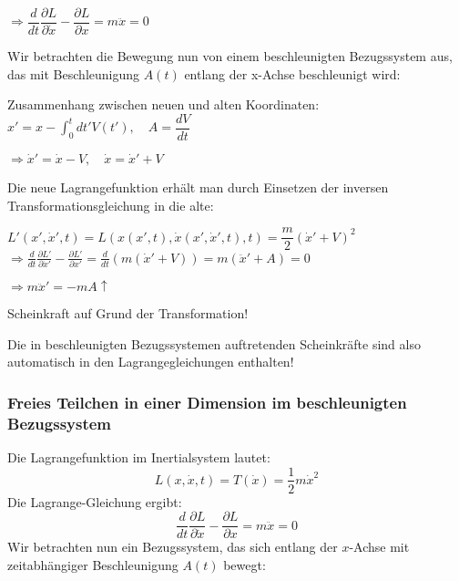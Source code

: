 \documentclass[10pt, letterpaper]{article}
\begin{document}
$\Rightarrow \dfrac{d}{dt}\dfrac{\partial L}{\partial \dot{x}} - \dfrac{\partial L}{\partial x} = m\ddot{x} = 0$

Wir betrachten die Bewegung nun von einem beschleunigten Bezugssystem aus, das mit Beschleunigung $A(t)$ entlang der x-Achse beschleunigt wird:


Zusammenhang zwischen neuen und alten Koordinaten:
$x' = x - \int_0^t dt' V(t'), \quad A = \dfrac{dV}{dt}$

$\Rightarrow \dot{x}' = \dot{x} - V, \quad \dot{x} = \dot{x}' + V$

Die neue Lagrangefunktion erhält man durch Einsetzen der inversen Transformationsgleichung in die alte:

$L'(x',\dot{x}',t) = L(x(x',t),\dot{x}(x',\dot{x}',t),t) = \dfrac{m}{2}(\dot{x}' + V)^2$
$\Rightarrow \frac{d}{dt}\frac{\partial L'}{\partial \dot{x}'} - \frac{\partial L'}{\partial x'} = \frac{d}{dt}(m(\dot{x}'+V)) = m(\ddot{x}'+A) = 0$

$\Rightarrow m\ddot{x}' = -mA \uparrow$

\noindent Scheinkraft auf Grund der Transformation!

Die in beschleunigten Bezugssystemen auftretenden Scheinkräfte sind also automatisch in den Lagrangegleichungen enthalten!





\subsubsection{Freies Teilchen in einer Dimension im beschleunigten Bezugssystem}


\begin{center}
\end{center}

Die Lagrangefunktion im Inertialsystem lautet:
\[
L(x,\dot{x},t) = T(\dot{x}) = \frac{1}{2} m \dot{x}^2
\]
Die Lagrange-Gleichung ergibt:
\[
\frac{d}{dt} \frac{\partial L}{\partial \dot{x}} - \frac{\partial L}{\partial x} = m \ddot{x} = 0
\]
Wir betrachten nun ein Bezugssystem, das sich entlang der \( x \)-Achse mit zeitabhängiger Beschleunigung \( A(t) \) bewegt:
\end{document}
